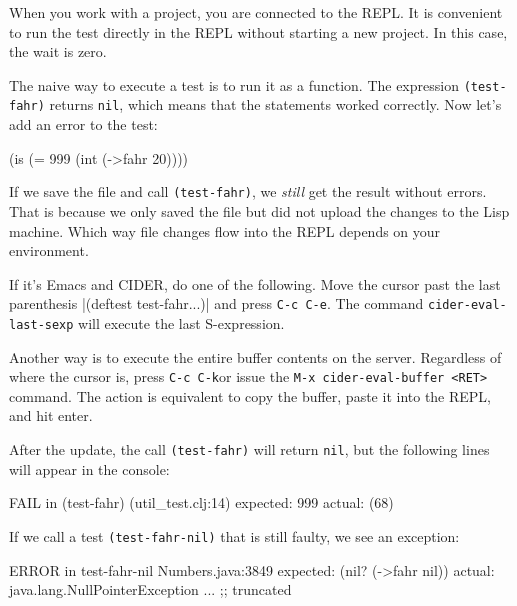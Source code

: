 When you work with a project, you are connected to the REPL. It is convenient to run the test directly in the REPL without starting a new project. In this case, the wait is zero.

The naive way to execute a test is to run it as a function. The expression \verb|(test-fahr)| returns \verb|nil|, which means that the statements worked correctly. Now let's add an error to the test:

\begin{english}
  \begin{clojure}
(is (= 999 (int (->fahr 20))))
  \end{clojure}
\end{english}

If we save the file and call \verb|(test-fahr)|, we \emph{still} get the result without errors. That is because we only saved the file but did not upload the changes to the Lisp machine. Which way file changes flow into the REPL depends on your environment.


If it's Emacs and CIDER, do one of the following. Move the cursor past the last parenthesis \spverb|(deftest test-fahr...)| and press \verb|C-c C-e|. The command \texttt{cider\--eval-last-sexp} will execute the last S-expression.

Another way is to execute the entire buffer contents on the server. Regardless of where the cursor is, press \verb|C-c C-k|or issue the \verb|M-x cider-eval-buffer <RET>| command. The action is equivalent to copy the buffer, paste it into the REPL, and hit enter.

After the update, the call \verb|(test-fahr)| will return \verb|nil|, but the following lines will appear in the console:

\begin{english}
  \begin{clojure}
FAIL in (test-fahr) (util_test.clj:14)
expected: 999
  actual: (68)
  \end{clojure}
\end{english}

If we call a test \verb|(test-fahr-nil)| that is still faulty, we see an exception:

\ifx\DEVICETYPE\MOBILE

\begin{english}
  \begin{clojure}
ERROR in test-fahr-nil Numbers.java:3849
expected: (nil? (->fahr nil))
  actual: java.lang.NullPointerException
    ... ;; truncated
  \end{clojure}
\end{english}

